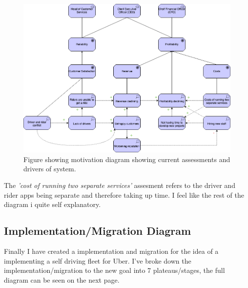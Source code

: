 \documentclass{article}
\begin{document}
    \begin{figure}[H]
      \centering
      \captionsetup{justification=centering}
      \includegraphics[width=12cm]{assets/motivation.drawio.png}
      \caption{Figure showing motivation diagram showing current assessments and drivers of system.}
      \label{fig:motivationsDiagram}
    \end{figure}

    The \textit{'cost of running two separate services'} assesment refers to the driver and rider apps being separate and therefore taking up time. I feel 
    like the rest of the diagram i quite self explanatory.

    \newpage

    \subsection{Implementation/Migration Diagram}
    Finally I have created a implementation and migration for the idea of a implementing a self driving fleet for Uber.
    I've broke down the implementation/migration to the new goal into 7 plateaus/stages, the full diagram can be seen on the next page.
\end{document}
